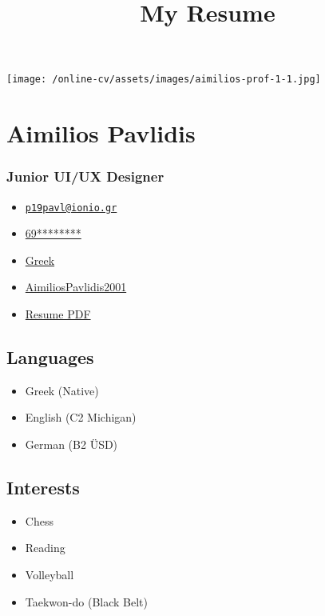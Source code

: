 \documentclass[english,]{article}
\title{My Resume}
\date{}
\providecommand{\tightlist}{%
  \setlength{\itemsep}{0pt}\setlength{\parskip}{0pt}}
\begin{document}
\maketitle

\texttt{[image: /online-cv/assets/images/aimilios-prof-1-1.jpg]}

\hypertarget{aimilios-pavlidis}{%
\section{Aimilios Pavlidis}\label{aimilios-pavlidis}}

\hypertarget{junior-uiux-designer}{%
\subsubsection{Junior UI/UX Designer}\label{junior-uiux-designer}}

\begin{itemize}
\tightlist
\item
  \emph{} \href{mailto:p19pavl@ionio.gr}{\nolinkurl{p19pavl@ionio.gr}}
\item
  \emph{} \href{tel:69********}{69********}
\item
  \emph{} \href{}{Greek}
\item
  \emph{}
  \href{http://github.com/AimiliosPavlidis2001}{AimiliosPavlidis2001}
\item
  \emph{}
  \href{https://drive.google.com/file/d/1FBQI5wmB7xP1_o9ynTIDTYtP6s1AcLL5/view?usp=sharing}{Resume
  PDF}
\end{itemize}

\hypertarget{languages}{%
\subsection{Languages}\label{languages}}

\begin{itemize}
\tightlist
\item
  Greek {(Native)}
\item
  English {(C2 Michigan)}
\item
  German {(B2 ÜSD)}
\end{itemize}

\hypertarget{interests}{%
\subsection{Interests}\label{interests}}

\begin{itemize}
\tightlist
\item
  Chess
\item
  Reading
\item
  Volleyball
\item
  Taekwon-do (Black Belt)
\end{itemize}
\end{document}
